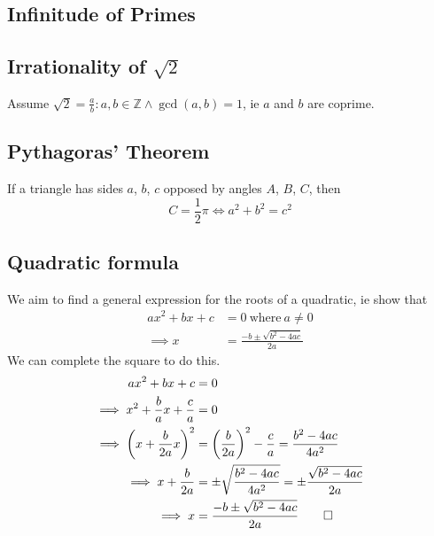 \documentclass[fleqn,a4paper,11pt]{article}
\begin{document}
    \subsection{Infinitude of Primes}

    \subsection[Irrationality of \(\sqrt 2\)]{Irrationality of \boldmath\(\sqrt 2\)}

    Assume \(\sqrt 2 = \frac ab : a, b \in \mathbb{Z} \land \gcd(a, b) = 1\), ie
    \(a\) and \(b\) are coprime.

    \subsection{Pythagoras' Theorem} \label{sec:pythagoras}


    If a triangle has sides \(a\), \(b\), \(c\) opposed by angles \(A\), \(B\), \(C\),
    then
    \begin{equation}
    C = \frac 12 \pi \iff a^2 + b^2 = c^2
    \end{equation}

    \subsection{Quadratic formula} \label{sec:quad_formula}

    We aim to find a general expression for the roots of a quadratic, ie show
    that
    \begin{equation}
    \begin{split}
    ax^2 + bx + c &= 0\ \text{where}\ a \neq 0 \\
    \implies x &= \frac{-b \pm \sqrt{b^2 - 4ac}}{2a}
    \end{split}
    \end{equation}
    We can complete the square to do this.
    \begin{align*}
    ax^2 + bx + c &= 0 \\
    \implies x^2 + \frac{b}{a}x + \frac{c}{a} &= 0 \\
    \implies \pqty{x + \frac{b}{2a}x}^2 &= \pqty{\frac{b}{2a}}^2 - \frac{c}{a}
        = \frac{b^2 - 4ac}{4a^2} \\
    \implies x + \frac{b}{2a} &= \pm \sqrt{\frac{b^2 - 4ac}{4a^2}}
        = \pm \frac{\sqrt{b^2 - 4ac}}{2a} \\
    \implies x &= \frac{-b \pm \sqrt{b^2 - 4ac}}{2a} \qed
    \end{align*}
\end{document}
